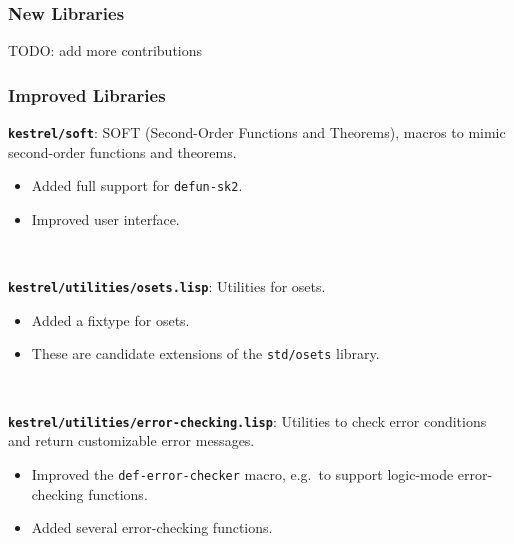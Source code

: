 \documentclass{beamer}
\newcommand{\code}[1]{\texttt{#1}}
\newcommand{\bookpath}[1]{\textbf{\code{#1}}}
\newcommand{\newlibtitle}{\frametitle{New Libraries}}
\newcommand{\implibtitle}{\frametitle{Improved Libraries}}
\begin{document}

\begin{frame}

\newlibtitle

TODO: add more contributions

\end{frame}


\begin{frame}

\implibtitle

\bookpath{kestrel/soft}:
SOFT (Second-Order Functions and Theorems),
macros to mimic second-order functions and theorems.
\begin{itemize}
\item
Added full support for \code{defun-sk2}.
\item
Improved user interface.
\end{itemize}

\

\bookpath{kestrel/utilities/osets.lisp}:
Utilities for osets.
\begin{itemize}
\item
Added a fixtype for osets.
\item
These are candidate extensions of the \code{std/osets} library.
\end{itemize}

\

\bookpath{kestrel/utilities/error-checking.lisp}:
Utilities to check error conditions and return customizable error messages.
\begin{itemize}
\item
Improved the \code{def-error-checker} macro,
e.g.\ to support logic-mode error-checking functions.
\item
Added several error-checking functions.
\end{itemize}

\end{frame}

\end{document}
